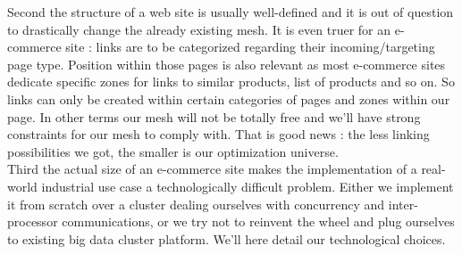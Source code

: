 \documentclass{iSWAGArticle}
\begin{document}
  \indent
  Second the structure of a web site is usually well-defined and it is out of question to drastically change the already existing mesh.
  It is even truer for an e-commerce site : links are to be categorized regarding their incoming/targeting page type. Position within those pages
  is also relevant as most e-commerce sites dedicate specific zones for links to similar products, list of products and so on.
  So links can only be created within certain categories of pages and zones within our page. In other terms our mesh will not be totally free and 
  we'll have strong constraints for our mesh to comply with. That is good news : the less linking possibilities we got, the smaller is our optimization universe.
  \\
  \indent
  Third the actual size of an e-commerce site makes the implementation of a real-world industrial use case a technologically difficult problem.
  Either we implement it from scratch over a cluster dealing ourselves with concurrency and inter-processor communications,
  or we try not to reinvent the wheel and plug ourselves to existing big data cluster platform. We'll here detail our technological choices.
\end{document}
